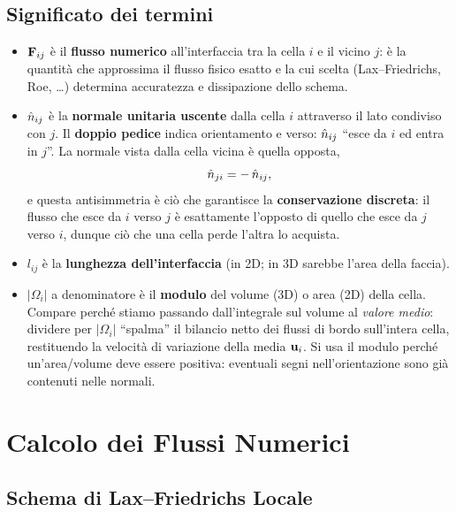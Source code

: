 \subsection{Significato dei termini}

\begin{itemize}
  \item $\mathbf{F}_{ij}$ è il \textbf{flusso numerico} all'interfaccia tra la cella $i$ e
    il vicino $j$: è la quantità che approssima il flusso fisico esatto e la cui scelta
    (Lax--Friedrichs, Roe, \dots) determina accuratezza e dissipazione dello schema.
  \item $\hat{n}_{ij}$ è la \textbf{normale unitaria uscente} dalla cella $i$ attraverso
    il lato condiviso con $j$. Il \textbf{doppio pedice} indica orientamento e verso:
    $\hat{n}_{ij}$ ``esce da $i$ ed entra in $j$''. La normale vista dalla cella vicina è
    quella opposta,
    \begin{equation}
      \hat{n}_{ji} = -\,\hat{n}_{ij},
    \end{equation}
    e questa antisimmetria è ciò che garantisce la \textbf{conservazione discreta}: il
    flusso che esce da $i$ verso $j$ è esattamente l'opposto di quello che esce da $j$
    verso $i$, dunque ciò che una cella perde l'altra lo acquista.
  \item $l_{ij}$ è la \textbf{lunghezza dell'interfaccia} (in 2D; in 3D sarebbe l'area
    della faccia).
  \item $|\Omega_i|$ a denominatore è il \textbf{modulo} del volume (3D) o area (2D)
    della cella. Compare perché stiamo passando dall'integrale sul volume al
    \emph{valore medio}: dividere per $|\Omega_i|$ ``spalma'' il bilancio netto dei
    flussi di bordo sull'intera cella, restituendo la velocità di variazione della
    media $\mathbf{u}_i$. Si usa il modulo perché un'area/volume deve essere positiva:
    eventuali segni nell'orientazione sono già contenuti nelle normali.
\end{itemize}

\section{Calcolo dei Flussi Numerici}
\label{sec:flussi}

\subsection{Schema di Lax--Friedrichs Locale}

